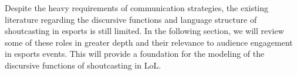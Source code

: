 \medskip

Despite the heavy requirements of communication strategies, the existing literature regarding the discursive functions and language structure of shoutcasting in esports is still limited. In the following section, we will review some of these roles in greater depth and their relevance to audience engagement in esports events. This will provide a foundation for the modeling of the discursive functions of shoutcasting in LoL.